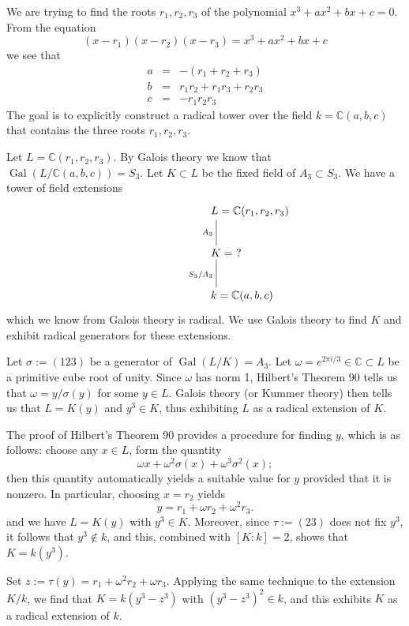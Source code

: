 \documentclass[12pt]{article}
\newcommand{\C}{\mathbb{C}}
\newcommand{\Gal}{\operatorname{Gal}}
\begin{document}
We are trying to find the roots $r_1, r_2, r_3$ of the polynomial $x^3
+ ax^2 + bx + c = 0$. From the equation
$$
(x-r_1)(x-r_2)(x-r_3) = x^3 + ax^2 + bx + c
$$
we see that
\begin{eqnarray*}
a & = & -(r_1 + r_2 + r_3) \\
b & = & r_1 r_2 + r_1 r_3 + r_2 r_3 \\
c & = & -r_1 r_2 r_3
\end{eqnarray*}
The goal is to explicitly construct a radical tower over the field
$k = \C(a,b,c)$ that contains the three roots $r_1, r_2, r_3$.

Let $L = \C(r_1,r_2,r_3)$. By Galois theory we know that
$\Gal(L/\C(a,b,c)) = S_3$. Let $K \subset L$ be the fixed field of
$A_3 \subset S_3$. We have a tower of field extensions
$$
\xymatrix{
\makebox[1em][l]{$L = \C(r_1,r_2,r_3)$} \ar@{-}[d]_{A_3} \\
\makebox[1em][l]{$K =\ ?$} \ar@{-}[d]_{S_3/A_3} \\
\makebox[1em][l]{$k = \C(a,b,c)$}
}
$$
which we know from Galois theory is radical. We use Galois theory to find $K$ and exhibit radical generators for these extensions.

Let $\sigma := (123)$ be a generator of $\Gal(L/K) = A_3$. Let $\omega = e^{2 \pi i/3} \in \C \subset L$ be a primitive cube root of unity. Since $\omega$ has norm 1, Hilbert's Theorem 90 tells us that $\omega = y/\sigma(y)$ for some $y \in L$. Galois theory (or Kummer theory) then tells us that $L = K(y)$ and $y^3 \in K$, thus exhibiting $L$ as a radical extension of $K$.

The proof of Hilbert's Theorem 90 provides a procedure for finding $y$, which is as follows: choose any $x \in L$, form the quantity
$$
\omega x + \omega^2 \sigma(x) + \omega^3 \sigma^2(x);
$$
then this quantity automatically yields a suitable value for $y$ provided that it is nonzero. In particular, choosing $x = r_2$ yields
$$
y = r_1 + \omega r_2 + \omega^2 r_3.
$$
and we have $L = K(y)$ with $y^3 \in K$. Moreover, since $\tau := (23)$ does not fix $y^3$, it follows that $y^3 \notin k$, and this, combined with $[K:k] = 2$, shows that $K = k(y^3)$.

Set $z := \tau(y) = r_1 + \omega^2 r_2 + \omega r_3$. Applying the same technique to the extension $K/k$, we find that $K = k(y^3 - z^3)$ with $(y^3-z^3)^2 \in k$, and this exhibits $K$ as a radical extension of $k$.
\end{document}
